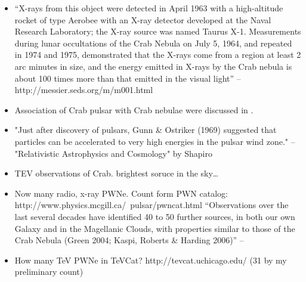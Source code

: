 \begin{itemize}
  \item ``X-rays from this object were detected in April 1963 with a
      high-altitude rocket of type Aerobee with an X-ray detector developed
      at the Naval Research Laboratory; the X-ray source was named Taurus
      X-1. Measurements during lunar occultations of the Crab Nebula on
      July 5, 1964, and repeated in 1974 and 1975, demonstrated that the
      X-rays come from a region at least 2 arc minutes in size, and the
      energy emitted in X-rays by the Crab nebula is about 100 times more
      than that emitted in the visual light''
        -- http://messier.seds.org/m/m001.html
  \item Association of Crab pulsar with Crab nebulae were 
    discussed in \citep{staelin_1968_pulsating-radio}.
  \item
    "Just after discovery of pulsars, Gunn \& Ostriker (1969) suggested
    that particles can be accelerated to very high energies in the pulsar
    wind zone." -- "Relativistic Astrophysics and Cosmology" by Shapiro
  \item TEV observations of Crab. brightest soruce in the sky\ldots
  \item Now many radio, x-ray PWNe. Count form PWN catalog:
    http://www.physics.mcgill.ca/~pulsar/pwncat.html
    ``Observations over the last several decades have identified 40 to 50
    further sources, in both our own Galaxy and in the Magellanic Clouds,
    with properties similar to those of the Crab Nebula (Green 2004;
    Kaspi, Roberts \& Harding 2006)'' -- \cite{gaensler_2006_evolution-structure}
  \item How many TeV PWNe in TeVCat? http://tevcat.uchicago.edu/ (31 by my preliminary count)
\end{itemize}




